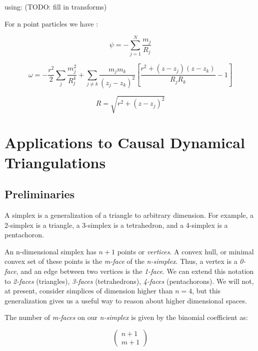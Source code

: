 \documentclass{article}
\begin{document}
using: (TODO: fill in transforms)

For n point particles we have \cite{letelier1997superposition}:

\begin{equation}
\psi=-\sum_{j=1}^{N}\frac{m_{j}}{R_{j}}
\end{equation}


\begin{equation}
\omega=-\frac{r^{2}}{2}\sum_{j}\frac{m_{j}^{2}}{R_{j}^{4}}+\sum_{j\neq k}\frac{m_{j}m_{k}}{\left(z_{j}-z_{k}\right)^{2}}\left[\frac{r^{2}+\left(z-z_{j}\right)\left(z-z_{k}\right)}{R_{j}R_{k}}-1\right]
\end{equation}


\begin{equation}
R=\sqrt{r^{2}+\left(z-z_{j}\right)^{2}}
\end{equation}

\section{Applications to Causal Dynamical Triangulations}

\subsection{Preliminaries}

A simplex is a generalization of a triangle to arbitrary dimension. For example, a 2-simplex is a triangle, a 3-simplex is a tetrahedron, and a 4-simplex is a pentachoron.

An n-dimensional simplex has $n+1$ points or \emph{vertices}. A convex hull, or minimal convex set of these points is the \emph{m-face} of the \emph{n-simplex}. Thus, a vertex is a \emph{0-face}, and an edge between two vertices is the \emph{1-face}. We can extend this notation to \emph{2-faces} (triangles), \emph{3-faces} (tetrahedrons), \emph{4-faces} (pentachorons). We will not, at present, consider simplices of dimension higher than $n=4$, but this generalization gives us a useful way to reason about higher dimensional spaces.

The number of \emph{m-faces} on our \emph{n-simplex} is given by the binomial coefficient as:

\begin{equation}
\left(\begin{array}{c}n+1\\m+1\end{array}\right)
\end{equation}
\end{document}
